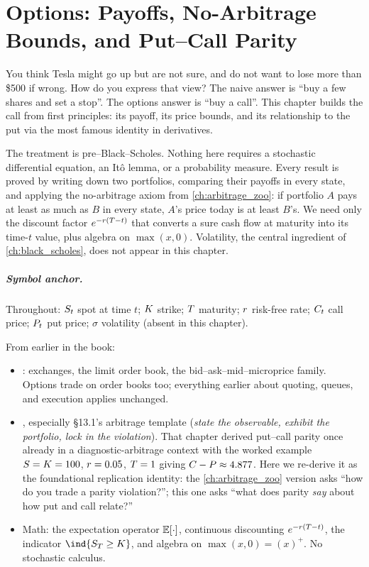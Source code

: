 \chapter{Options: Payoffs, No-Arbitrage Bounds, and Put--Call Parity}
\label{ch:options_payoffs}

You think Tesla might go up but are not sure, and do not want to
lose more than \$500 if wrong. How do you express that view? The
naive answer is ``buy a few shares and set a stop''. The options
answer is ``buy a call''. This chapter builds the call from first
principles: its payoff, its price bounds, and its relationship to
the put via the most famous identity in derivatives.

The treatment is pre--Black--Scholes. Nothing here requires a
stochastic differential equation, an Itô lemma, or a probability
measure. Every result is proved by writing down two portfolios,
comparing their payoffs in every state, and applying the
no-arbitrage axiom from \cref{ch:arbitrage_zoo}: if portfolio $A$
pays at least as much as $B$ in every state, $A$'s price today
is at least $B$'s. We need only the discount factor
$e^{-r(T - t)}$ that converts a sure cash flow at maturity
into its time-$t$ value, plus algebra on $\max(x, 0)$. Volatility,
the central ingredient of \cref{ch:black_scholes}, does not appear
in this chapter.

\paragraph{Symbol anchor.} Throughout: $S_t$ spot at time $t$;
$K$ strike; $T$ maturity; $r$ risk-free rate;
$C_t$ call price; $P_t$ put price; $\sigma$ volatility
(absent in this chapter).

\begin{backgroundbox}[Prerequisites]
From earlier in the book:
\begin{itemize}
  \item {}: exchanges,
  the limit order book, the bid--ask--mid--microprice family.
  Options trade on order books too; everything earlier about
  quoting, queues, and execution applies unchanged.
  \item {}, especially \S13.1's arbitrage
  template (\emph{state the observable, exhibit the portfolio,
  lock in the violation}). That chapter derived put--call parity
  once already in a diagnostic-arbitrage context with the worked
  example $S = K = 100$, $r = 0.05$, $T = 1$
  giving $C - P \approx 4.877$. Here we re-derive it as
  the foundational replication identity: the
  \cref{ch:arbitrage_zoo} version asks ``how do you trade a
  parity violation?''; this one asks ``what does parity
  \emph{say} about how put and call relate?''
  \item Math: the expectation operator $\mathbb{E}[\cdot]$, continuous
  discounting $e^{-r(T - t)}$, the indicator
  $\ind\{\Spx_T \geq \Kstrike\}$, and algebra on
  $\max(x, 0) = (x)^+$. No stochastic calculus.
\end{itemize}
\end{backgroundbox}

